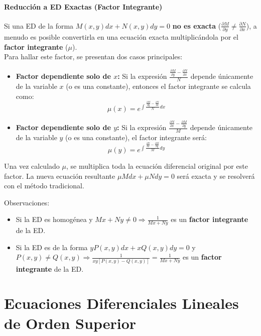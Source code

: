 \documentclass[a4paper,12pt]{article}
\begin{document}
\subsection{Reducción a ED Exactas (Factor Integrante)}
Si una ED de la forma $M(x,y)dx + N(x,y)dy = 0$ \textbf{no es exacta} ($\frac{\partial M}{\partial y} \neq \frac{\partial N}{\partial x}$), a menudo es posible convertirla en una ecuación exacta multiplicándola por el \textbf{factor integrante} ($\mu$).
\\[3mm]
Para hallar este factor, se presentan dos casos principales:
\begin{itemize}
    \item \textbf{Factor dependiente solo de $x$:} Si la expresión $\frac{\frac{\partial M}{\partial y} - \frac{\partial N}{\partial x}}{N}$ depende únicamente de la variable $x$ (o es una constante), entonces el factor integrante se calcula como:
    $$ \mu(x) = e^{\int \frac{\frac{\partial M}{\partial y} - \frac{\partial N}{\partial x}}{N} dx} $$

    \item \textbf{Factor dependiente solo de $y$:} Si la expresión $\frac{\frac{\partial N}{\partial x} - \frac{\partial M}{\partial y}}{M}$ depende únicamente de la variable $y$ (o es una constante), el factor integrante será:
    $$ \mu(y) = e^{\int \frac{\frac{\partial N}{\partial x} - \frac{\partial M}{\partial y}}{M} dy} $$
\end{itemize}

Una vez calculado $\mu$, se multiplica toda la ecuación diferencial original por este factor. La nueva ecuación resultante $\mu M dx + \mu N dy = 0$ será exacta y se resolverá con el método tradicional.

Observaciones:
\begin{itemize}
    \item Si la ED es homogénea y $Mx + Ny \neq 0 \Rightarrow \frac{1}{Mx + Ny}$ es un \textbf{factor integrante} de la ED.
    \item Si la ED es de la forma $yP(x,y)dx + xQ(x,y)dy = 0$ y $P(x,y) \neq Q(x,y) \Rightarrow \frac{1}{xy[P(x,y)-Q(x,y)]} = \frac{1}{Mx + Ny}$ es un \textbf{factor integrante} de la ED.
\end{itemize}

\newpage
\part{Ecuaciones Diferenciales Lineales de Orden Superior}
\end{document}
